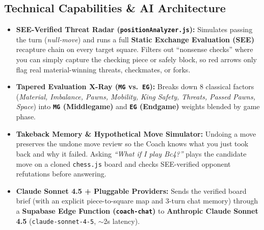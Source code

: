 \documentclass[10pt,twoside]{article}
\begin{document}
\subsection*{\sffamily\small\textcolor{brand}{Technical Capabilities \& AI Architecture}}
\scriptsize
\begin{itemize}[leftmargin=12pt, itemsep=1.2pt, topsep=1pt]
  \item \textbf{SEE-Verified Threat Radar (\texttt{positionAnalyzer.js}):} Simulates passing the turn (\emph{null-move}) and runs a full \textbf{Static Exchange Evaluation (SEE)} recapture chain on every target square. Filters out ``nonsense checks'' where you can simply capture the checking piece or safely block, so red arrows only flag real material-winning threats, checkmates, or forks.
  \item \textbf{Tapered Evaluation X-Ray (\texttt{MG} vs.\ \texttt{EG}):} Breaks down 8 classical factors (\emph{Material, Imbalance, Pawns, Mobility, King Safety, Threats, Passed Pawns, Space}) into \textbf{\texttt{MG} (Middlegame)} and \textbf{\texttt{EG} (Endgame)} weights blended by game phase.
  \item \textbf{Takeback Memory \& Hypothetical Move Simulator:} Undoing a move preserves the undone move review so the Coach knows what you just took back and why it failed. Asking \emph{``What if I play Bc4?''} plays the candidate move on a cloned \texttt{chess.js} board and checks SEE-verified opponent refutations before answering.
  \item \textbf{Claude Sonnet 4.5 + Pluggable Providers:} Sends the verified board brief (with an explicit piece-to-square map and 3-turn chat memory) through a \textbf{Supabase Edge Function (\texttt{coach-chat})} to \textbf{Anthropic Claude Sonnet 4.5} (\texttt{claude-sonnet-4-5}, $\sim$2s latency).
\end{itemize}
\end{document}
